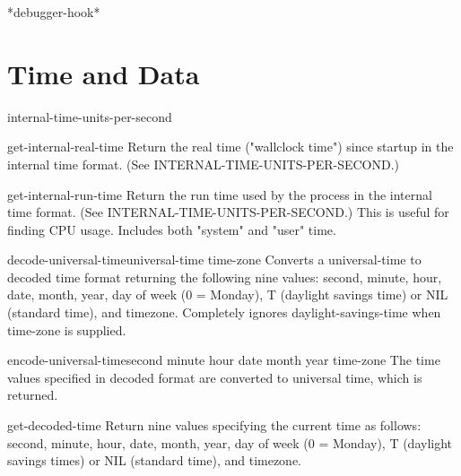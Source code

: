 \documentclass[10pt,english]{book}
\begin{document}
\begin{variable}{*debugger-hook*}{}
  
\end{variable}



\chapter{Time and Data}
\label{cha:time-data}

\begin{constant}{internal-time-units-per-second}{}
  
\end{constant}

\begin{function}{get-internal-real-time}{}
  Return the real time ("wallclock time") since startup in the internal
time format. (See INTERNAL-TIME-UNITS-PER-SECOND.)
\end{function}

\begin{function}{get-internal-run-time}{}
  Return the run time used by the process in the internal time format. (See
INTERNAL-TIME-UNITS-PER-SECOND.) This is useful for finding CPU usage.
Includes both "system" and "user" time.
\end{function}

\begin{function}{decode-universal-time}{universal-time \op time-zone}
  Converts a universal-time to decoded time format returning the following
   nine values: second, minute, hour, date, month, year, day of week (0 =
   Monday), T (daylight savings time) or NIL (standard time), and timezone.
   Completely ignores daylight-savings-time when time-zone is supplied.
\end{function}

\begin{function}{encode-universal-time}{second minute hour date month year \op time-zone}
  The time values specified in decoded format are converted to
   universal time, which is returned.
\end{function}

\begin{function}{get-decoded-time}{}
  Return nine values specifying the current time as follows:
   second, minute, hour, date, month, year, day of week (0 = Monday), T
   (daylight savings times) or NIL (standard time), and timezone.
\end{function}
\end{document}
